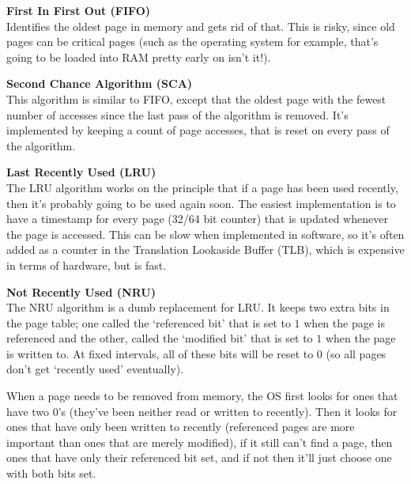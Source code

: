 \begin{description}
  \item \textbf{First In First Out (FIFO)}\\
    Identifies the oldest page in memory and gets rid of that. This is risky,
    since old pages can be critical pages (such as the operating system for
    example, that's going to be loaded into RAM pretty early on isn't it!).

  \item \textbf{Second Chance Algorithm (SCA)}\\
    This algorithm is similar to FIFO, except that the oldest page with the
    fewest number of accesses since the last pass of the algorithm is removed.
    It's implemented by keeping a count of page accesses, that is reset on every
    pass of the algorithm.

  \item \textbf{Last Recently Used (LRU)}\\
    The LRU algorithm works on the principle that if a page has been used
    recently, then it's probably going to be used again soon. The easiest
    implementation is to have a timestamp for every page (32/64 bit counter)
    that is updated whenever the page is accessed. This can be slow when
    implemented in software, so it's often added as a counter in the Translation
    Lookaside Buffer (TLB), which is
    expensive in terms of hardware, but is fast.

  \item \textbf{Not Recently Used (NRU)}\\
    The NRU algorithm is a dumb replacement for LRU. It keeps two extra bits in
    the page table; one called the `referenced bit' that is set to $1$ when the
    page is referenced and the other, called the `modified bit' that is set to
    $1$ when the page is written to. At fixed intervals, all of these bits will
    be reset to $0$ (so all pages don't get `recently used' eventually).

    When a page needs to be removed from memory, the OS first looks for ones
    that have two $0$'s (they've been neither read or written to recently). Then
    it looks for ones that have only been written to recently (referenced pages
    are more important than ones that are merely modified), if it still can't
    find a page, then ones that have only their referenced bit set, and if not
    then it'll just choose one with both bits set.
\end{description}

